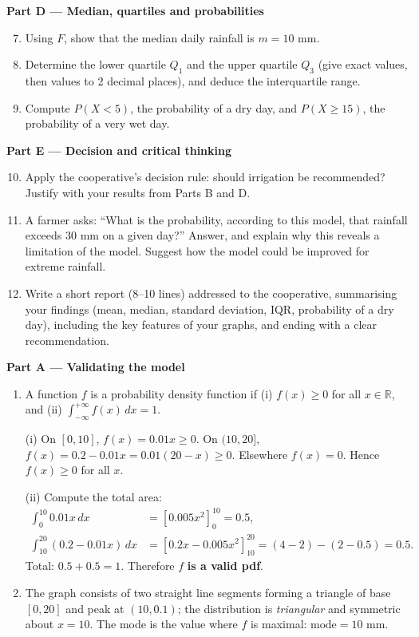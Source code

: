 \documentclass[11pt]{article}
\newcommand{\cle}[1]{{\popxbold\color{popdark}#1}}
\newcounter{popsec}
\newcounter{popsub}
\newcommand{\courssub}[1]{%
  \stepcounter{popsub}%
  \par\vspace{9pt}\noindent{\popxbold\fontsize{11.5}{13}\selectfont\color{popink}{\color{poporange}\thepopsec.\thepopsub}\hspace{6pt}#1}\par\nopagebreak\vspace{4pt}
}
\begin{document}
\textbf{Part D --- Median, quartiles and probabilities}

\begin{enumerate}
\setcounter{enumi}{6}
\item Using $F$, show that the median daily rainfall is $m=10$ mm.
\item Determine the lower quartile $Q_1$ and the upper quartile $Q_3$ (give exact values, then values to 2 decimal places), and deduce the interquartile range.
\item Compute $P(X<5)$, the probability of a dry day, and $P(X\geq 15)$, the probability of a very wet day.
\end{enumerate}

\textbf{Part E --- Decision and critical thinking}

\begin{enumerate}
\setcounter{enumi}{9}
\item Apply the cooperative's decision rule: should irrigation be recommended? Justify with your results from Parts B and D.
\item A farmer asks: ``What is the probability, according to this model, that rainfall exceeds $30$ mm on a given day?'' Answer, and explain why this reveals a limitation of the model. Suggest how the model could be improved for extreme rainfall.
\item Write a short report (8--10 lines) addressed to the cooperative, summarising your findings (mean, median, standard deviation, IQR, probability of a dry day), including the key features of your graphs, and ending with a clear recommendation.
\end{enumerate}

\courssub{Model answer}

\textbf{Part A --- Validating the model}

\begin{enumerate}
\item A function $f$ is a probability density function if (i) $f(x)\geq 0$ for all $x\in\mathbb{R}$, and (ii) $\displaystyle\int_{-\infty}^{+\infty}f(x)\,dx=1$.

(i) On $[0,10]$, $f(x)=0.01x\geq 0$. On $(10,20]$, $f(x)=0.2-0.01x=0.01(20-x)\geq 0$. Elsewhere $f(x)=0$. Hence $f(x)\geq 0$ for all $x$.

(ii) Compute the total area:
\begin{align*}
\int_{0}^{10}0.01x\,dx &= \left[0.005x^2\right]_0^{10}=0.5,\\
\int_{10}^{20}(0.2-0.01x)\,dx &= \left[0.2x-0.005x^2\right]_{10}^{20}=(4-2)-(2-0.5)=0.5.
\end{align*}
Total: $0.5+0.5=1$. Therefore $f$ \textbf{is a valid pdf}.

\item The graph consists of two straight line segments forming a triangle of base $[0,20]$ and peak at $(10,0.1)$; the distribution is \emph{triangular} and symmetric about $x=10$. The \cle{mode} is the value where $f$ is maximal: $\mathrm{mode}=10$ mm.
\end{enumerate}
\end{document}
